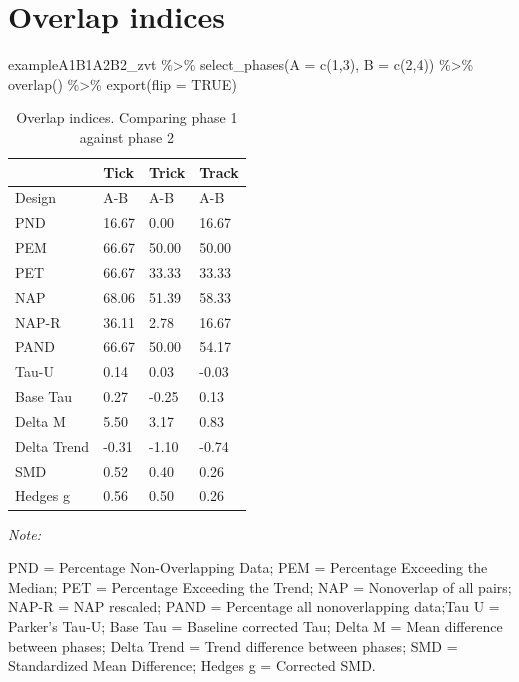 \documentclass[
]{book}
\newenvironment{Shaded}{\begin{snugshade}}{\end{snugshade}}
\newcommand{\AttributeTok}[1]{\textcolor[rgb]{0.77,0.63,0.00}{#1}}
\newcommand{\ConstantTok}[1]{\textcolor[rgb]{0.00,0.00,0.00}{#1}}
\newcommand{\DecValTok}[1]{\textcolor[rgb]{0.00,0.00,0.81}{#1}}
\newcommand{\FunctionTok}[1]{\textcolor[rgb]{0.00,0.00,0.00}{#1}}
\newcommand{\NormalTok}[1]{#1}
\newcommand{\SpecialCharTok}[1]{\textcolor[rgb]{0.00,0.00,0.00}{#1}}
\begin{document}
\hypertarget{overlap-indices}{%
\section{Overlap indices}\label{overlap-indices}}

\begin{Shaded}
\begin{Highlighting}[]
\NormalTok{exampleA1B1A2B2\_zvt }\SpecialCharTok{\%\textgreater{}\%}
  \FunctionTok{select\_phases}\NormalTok{(}\AttributeTok{A =} \FunctionTok{c}\NormalTok{(}\DecValTok{1}\NormalTok{,}\DecValTok{3}\NormalTok{), }\AttributeTok{B =} \FunctionTok{c}\NormalTok{(}\DecValTok{2}\NormalTok{,}\DecValTok{4}\NormalTok{)) }\SpecialCharTok{\%\textgreater{}\%}
  \FunctionTok{overlap}\NormalTok{() }\SpecialCharTok{\%\textgreater{}\%}
  \FunctionTok{export}\NormalTok{(}\AttributeTok{flip =} \ConstantTok{TRUE}\NormalTok{)}
\end{Highlighting}
\end{Shaded}

\begin{table}[!h]

\caption{\label{tab:unnamed-chunk-86}Overlap indices. Comparing phase 1 against phase 2}
\begin{threeparttable}
\begin{tabular}[t]{llll}
\toprule
  & Tick & Trick & Track\\
\midrule
Design & A-B & A-B & A-B\\
PND & 16.67 & 0.00 & 16.67\\
PEM & 66.67 & 50.00 & 50.00\\
PET & 66.67 & 33.33 & 33.33\\
NAP & 68.06 & 51.39 & 58.33\\
NAP-R & 36.11 & 2.78 & 16.67\\
PAND & 66.67 & 50.00 & 54.17\\
Tau-U & 0.14 & 0.03 & -0.03\\
Base Tau & 0.27 & -0.25 & 0.13\\
Delta M & 5.50 & 3.17 & 0.83\\
Delta Trend & -0.31 & -1.10 & -0.74\\
SMD & 0.52 & 0.40 & 0.26\\
Hedges g & 0.56 & 0.50 & 0.26\\
\bottomrule
\end{tabular}
\begin{tablenotes}
\item \textit{Note: } 
\item PND = Percentage Non-Overlapping Data; PEM = Percentage Exceeding the Median; PET = Percentage Exceeding the Trend; NAP = Nonoverlap of all pairs; NAP-R = NAP rescaled; PAND = Percentage all nonoverlapping data;Tau U = Parker's Tau-U; Base Tau = Baseline corrected Tau; Delta M = Mean difference between phases; Delta Trend = Trend difference between phases; SMD = Standardized Mean Difference; Hedges g = Corrected SMD.
\end{tablenotes}
\end{threeparttable}
\end{table}
\end{document}
